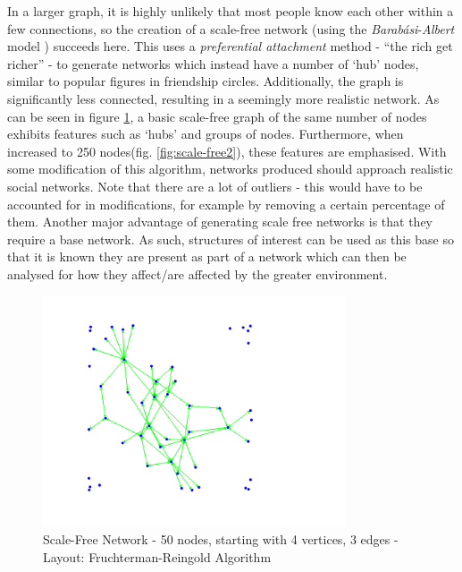 \documentclass[]{article}
\begin{document}
In a larger graph, it is highly unlikely that most people know each other within a few connections, so the creation of a scale-free network (using the \emph{Barab\'{a}si}-\emph{Albert} model \cite{BAMod}) succeeds here. This uses a \emph{preferential attachment} method - ``the rich get richer'' - to generate networks which instead have a number of `hub' nodes, similar to popular figures in friendship circles. Additionally, the graph is significantly less connected, resulting in a seemingly more realistic network. As can be seen in figure \ref{fig:scale-free1}, a basic scale-free graph of the same number of nodes exhibits features such as `hubs' and groups of nodes. Furthermore, when increased to 250 nodes(fig. \ref{fig:scale-free2}), these features are emphasised. With some modification of this algorithm, networks produced should approach realistic social networks. Note that there are a lot of outliers - this would have to be accounted for in modifications, for example by removing a certain percentage of them. Another major advantage of generating scale free networks is that they require a base network. As such, structures of interest can be used as this base so that it is known they are present as part of a network which can then be analysed for how they affect/are affected by the greater environment.

\begin{figure}
	\centering
		\includegraphics[width=0.80\textwidth]{scale-free1.png}
	\caption{Scale-Free Network - 50 nodes, starting with 4 vertices, 3 edges - Layout: Fruchterman-Reingold Algorithm}
	\label{fig:scale-free1}
\end{figure}
\end{document}
